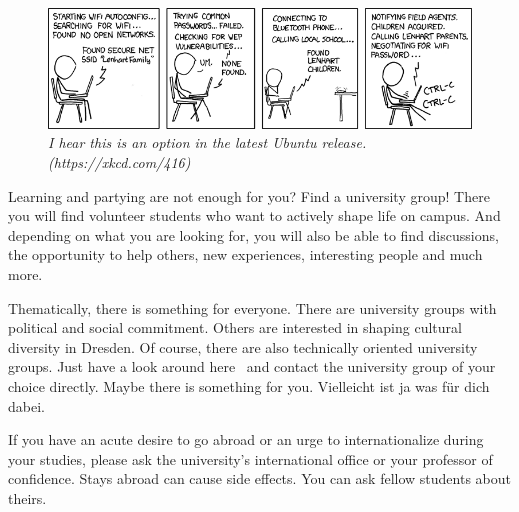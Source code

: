 \begin{figure}[b]
	\centering
	\includegraphics[width=\textwidth, keepaspectratio]{img/xkcd/zealous_autoconfig.png}
	\caption*{{\small \textit{I hear this is an option in the latest Ubuntu release. (https://xkcd.com/416)}}}
\end{figure}

\label{sec:hsg}

Learning and partying are not enough for you? Find a university group! There you will find volunteer students who want to actively shape life on campus. And depending on what you are looking for, you will also be able to find discussions, the opportunity to help others, new experiences, interesting people and much more.

Thematically, there is something for everyone. There are university groups with political and social commitment. Others are interested in shaping cultural diversity in Dresden. Of course, there are also technically oriented university groups. Just have a look around here~ and contact the university group of your choice directly. Maybe there is something for you.
Vielleicht ist ja was für dich dabei.


If you have an acute desire to go abroad or an urge to internationalize during your studies, please ask the university's international office or your professor of confidence. Stays abroad can cause side effects. You can ask fellow students about theirs.


